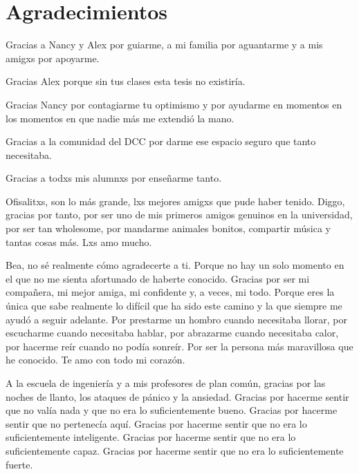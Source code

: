 \section*{Agradecimientos}
  Gracias a Nancy y Alex por guiarme, a mi familia por aguantarme y a mis amigxs por apoyarme.

  Gracias Alex porque sin tus clases esta tesis no existiría.

  Gracias Nancy por contagiarme tu optimismo y por ayudarme en momentos en los
  momentos en que nadie más me extendió la mano.

  Gracias a la comunidad del DCC por darme ese espacio seguro que tanto necesitaba.

  Gracias a todxs mis alumnxs por enseñarme tanto.


  Ofisalitxs, son lo más grande, lxs mejores amigxs que pude haber tenido.
  Diggo, gracias por tanto, por ser uno de mis primeros amigos genuinos en la universidad, por
  ser tan wholesome, por mandarme animales bonitos, compartir música y tantas cosas más.
  Lxs amo mucho.

  Bea, no sé realmente cómo agradecerte a ti.
  Porque no hay un solo momento en el que no me sienta afortunado de haberte conocido.
  Gracias por ser mi compañera, mi mejor amiga, mi confidente y, a veces, mi todo.
  Porque eres la única que sabe realmente lo difícil que ha sido este camino y la que siempre me
  ayudó a seguir adelante.
  Por prestarme un hombro cuando necesitaba llorar, por escucharme cuando necesitaba hablar, por
  abrazarme cuando necesitaba calor, por hacerme reír cuando no podía sonreír.
  Por ser la persona más maravillosa que he conocido.
  Te amo con todo mi corazón.

  A la escuela de ingeniería y a mis profesores de plan común, gracias por
  las noches de llanto, los ataques de pánico y la ansiedad.
  Gracias por hacerme sentir que no valía nada y que no era lo suficientemente
  bueno.
  Gracias por hacerme sentir que no pertenecía aquí.
  Gracias por hacerme sentir que no era lo suficientemente inteligente.
  Gracias por hacerme sentir que no era lo suficientemente capaz.
  Gracias por hacerme sentir que no era lo suficientemente fuerte.
  